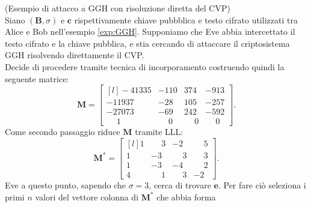\begin{exmp} (Esempio di attacco a GGH con risoluzione diretta del CVP) \\
Siano $(\mathbf{B}, \sigma)$ e $\mathbf{c}$ rispettivamente chiave pubbblica e testo cifrato
utilizzati tra Alice e Bob nell'esempio \ref{exp:GGH}. Supponiamo che Eve abbia intercettato 
il testo cifrato e la chiave pubblica, e stia cercando di attaccare il criptosistema GGH
risolvendo direttamente il CVP.\\ Decide di procedere tramite tecnica di incorporamento
costruendo quindi la seguente matrice:
\begin{equation*}
    \mathbf{M} =
    \begin{bmatrix*}[l]
        -41335 & -110 & 374 & -913\\
        -11937 & -28 & 105 & -257\\
        -27073 & -69 & 242 & -592 \\
        \phantom{-}1 & \phantom{-}0 & \phantom{-}0 & \phantom{-}0
    \end{bmatrix*}.
\end{equation*}
Come secondo passaggio riduce $\mathbf{M}$ tramite LLL:
\begin{equation*}
    \mathbf{M}^* =
    \begin{bmatrix*}[l]
        1 & \phantom{-}3  &           -2 & \phantom{-}5\\
        1 &          -3   & \phantom{-}3 & \phantom{-}3\\
        1 &          -3   &           -4 & \phantom{-}2 \\
        4 & \phantom{-}1  & \phantom{-}3 & -2
    \end{bmatrix*}.
\end{equation*}
Eve a questo punto, sapendo che $\sigma = 3$, cerca di trovare $\mathbf{e}$. 
Per fare ciò seleziona i primi $n$ valori del vettore colonna  di $\mathbf{M}^*$ 
che abbia forma


\end{exmp}
